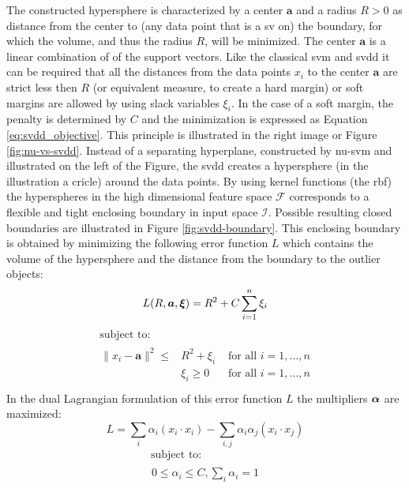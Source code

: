The constructed hypersphere is characterized by a center $\mathbf{a}$ and a radius $R > 0$ as distance from the center to (any data point that is a \gls{sv} on) the boundary, for which the volume, and thus the radius $R$, will be minimized.
The center $\mathbf{a}$ is a linear combination of of the support vectors.
Like the classical \gls{svm} and \gls{svdd} it can be required that all the distances from the data points $x_i$ to the center $\mathbf{a}$ are strict less then $R$ (or equivalent measure, to create a hard margin) or soft margins are allowed by using slack variables $\xi_i$.
In the case of a soft margin, the penalty is determined by $C$ and the minimization is expressed as Equation \ref{eq:svdd_objective}.
This principle is illustrated in the right image or Figure \ref{fig:nu-vs-svdd}.
Instead of a separating hyperplane, constructed by \gls{nu-svm} and illustrated on the left of the Figure, the \gls{svdd} creates a hypersphere (in the illustration a cricle) around the data points.
By using kernel functions (\eg the \gls{rbf}) the hyperspheres in the high dimensional feature space $\mathcal{F}$ corresponds to a flexible and tight enclosing boundary in input space $\mathcal{I}$.
Possible resulting closed boundaries are illustrated in Figure \ref{fig:svdd-boundary}.
This enclosing boundary is obtained by minimizing the following error function $L$ which contains the volume of the hypersphere and the distance from the boundary to the outlier objects:
\begin{equation}\label{eq:svdd_objective}
  L(R, \vectorsym{a}, \vectorsym{\xi}) = R^2 + C \sum_{i=1}^n \xi_i
\end{equation}
\begin{equation}
  \begin{multlined}
    \mbox{ subject to: } \\
    \begin{aligned}
      \lVert x_i - \mathbf{a} \rVert ^ 2 \leq & R^2 + \xi_i & \mbox{ for all } i = 1, \dots, n \\
      & \xi_i \geq 0 & \mbox{ for all } i = 1, \dots, n \\
    \end{aligned}
  \end{multlined}
\end{equation}
In the dual Lagrangian formulation of this error function $L$ the multipliers $\vectorsym{\alpha}$ are maximized:
\begin{equation}\label{eq:svdd_lagrange}
  L = \sum_{i} \alpha_i(x_i \cdot x_i) - \sum_{i,j} \alpha_i \alpha_j(x_i \cdot x_j)
\end{equation}
\begin{equation}
  \begin{multlined}
    \mbox{ subject to: } \\
    \begin{aligned}
    0 \le \alpha_i \le C, \sum_{i} \alpha_i = 1
    \end{aligned}
  \end{multlined}
\end{equation}

